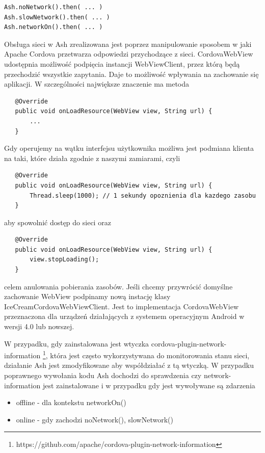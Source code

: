 \documentclass[brudnopis]{xmgr}
\begin{document}
\begin{lstlisting}
Ash.noNetwork().then( ... ) 
Ash.slowNetwork().then( ... ) 
Ash.networkOn().then( ... ) 
\end{lstlisting}

Obsługa sieci w Ash zrealizowana jest poprzez manipulowanie sposobem w jaki Apache Cordova przetwarza odpowiedzi przychodzące z sieci. CordovaWebView udostępnia możliwość podpięcia instancji WebViewClient, przez którą będą przechodzić wszystkie zapytania. Daje to możliwość wpływania na zachowanie się aplikacji. W szczególności największe znaczenie ma metoda

\begin{lstlisting}
   @Override
   public void onLoadResource(WebView view, String url) {
       ...
   }
\end{lstlisting}

Gdy operujemy na wątku interfejsu użytkownika możliwa jest podmiana klienta na taki, które działa zgodnie z naszymi zamiarami, czyli 

\begin{lstlisting}
   @Override
   public void onLoadResource(WebView view, String url) {
       Thread.sleep(1000); // 1 sekundy opoznienia dla kazdego zasobu
   }
\end{lstlisting}

aby spowolnić dostęp do sieci oraz

\begin{lstlisting}
   @Override
   public void onLoadResource(WebView view, String url) {
       view.stopLoading();
   }
\end{lstlisting}

celem anulowania pobierania zasobów. Jeśli chcemy przywrócić domyślne zachowanie WebView podpinamy nową instację klasy IceCreamCordovaWebViewClient. Jest to implementacja CordovaWebView przeznaczona dla urządzeń działających z systemem operacyjnym Android w wersji 4.0 lub nowszej.

W przypadku, gdy zainstalowana jest wtyczka cordova-plugin-network-information \footnote{https://github.com/apache/cordova-plugin-network-information}, która jest często wykorzystywana do monitorowania stanu sieci, działanie Ash jest zmodyfikowane aby współdziałać z tą wtyczką. W przypadku poprawnego wywołania kodu Ash dochodzi do sprawdzenia czy network-information jest zainstalowane i w przypadku gdy jest wywoływane są zdarzenia

\begin{itemize}
  \item offline - dla kontekstu networkOn() 
  \item online - gdy zachodzi noNetwork(), slowNetwork()
\end{itemize}
\end{document}
